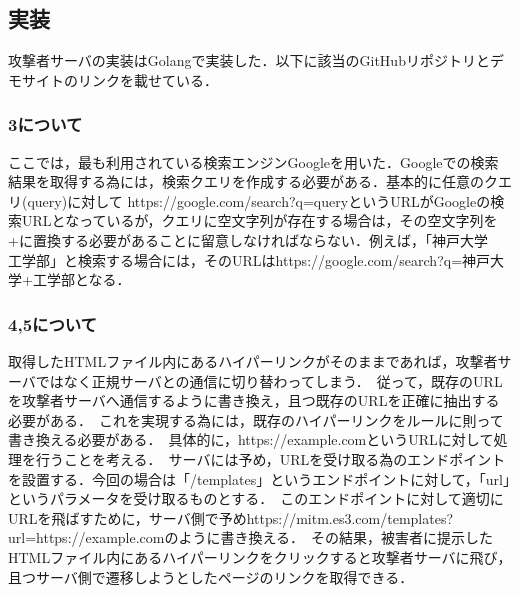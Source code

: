 \documentclass[dvipdfmx]{jsarticle}
\begin{document}
    \subsection{実装}
    攻撃者サーバの実装はGolangで実装した．以下に該当のGitHubリポジトリとデモサイトのリンクを載せている．
    \subsubsection{3について}
    ここでは，最も利用されている検索エンジンGoogleを用いた．Googleでの検索結果を取得する為には，検索クエリを作成する必要がある．基本的に任意のクエリ(query)に対して https://google.com/search?q=queryというURLがGoogleの検索URLとなっているが，クエリに空文字列が存在する場合は，その空文字列を+に置換する必要があることに留意しなければならない．例えば，「神戸大学　工学部」と検索する場合には，そのURLはhttps://google.com/search?q=神戸大学+工学部となる．
    \subsubsection{4,5について}
    取得したHTMLファイル内にあるハイパーリンクがそのままであれば，攻撃者サーバではなく正規サーバとの通信に切り替わってしまう．\
    従って，既存のURLを攻撃者サーバへ通信するように書き換え，且つ既存のURLを正確に抽出する必要がある．\
    これを実現する為には，既存のハイパーリンクをルールに則って書き換える必要がある．\
    具体的に，https://example.comというURLに対して処理を行うことを考える．\
    サーバには予め，URLを受け取る為のエンドポイントを設置する．今回の場合は「/templates」というエンドポイントに対して，「url」というパラメータを受け取るものとする．\
    このエンドポイントに対して適切にURLを飛ばすために，サーバ側で予めhttps://mitm.es3.com/templates?url=https://example.comのように書き換える．\
    その結果，被害者に提示したHTMLファイル内にあるハイパーリンクをクリックすると攻撃者サーバに飛び，且つサーバ側で遷移しようとしたページのリンクを取得できる．
\end{document}
